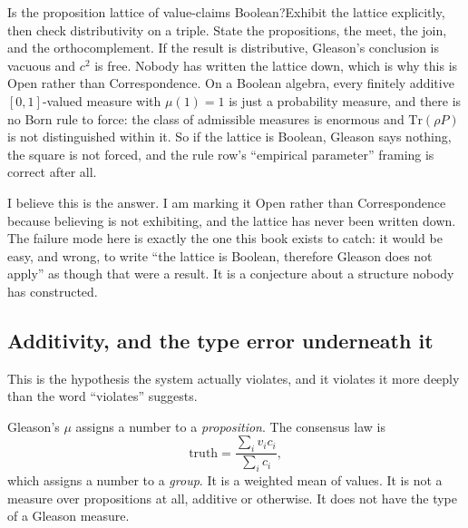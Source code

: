 \begin{Open}{Is the proposition lattice of value-claims Boolean?}{Exhibit the lattice explicitly, then check distributivity on a triple.}
State the propositions, the meet, the join, and the orthocomplement. If the result is distributive, Gleason's conclusion is vacuous and $c^2$ is free. Nobody has written the lattice down, which is why this is Open rather than Correspondence.
On a Boolean algebra, every finitely additive $[0,1]$-valued measure with $\mu(1)=1$ is just a probability measure, and there is no Born rule to force: the class of admissible measures is enormous and $\mathrm{Tr}(\rho P)$ is not distinguished within it. So if the lattice is Boolean, Gleason says nothing, the square is not forced, and the rule row's ``empirical parameter'' framing is correct after all.

I believe this is the answer. I am marking it Open rather than Correspondence because believing is not exhibiting, and the lattice has never been written down. The failure mode here is exactly the one this book exists to catch: it would be easy, and wrong, to write ``the lattice is Boolean, therefore Gleason does not apply'' as though that were a result. It is a conjecture about a structure nobody has constructed.
\end{Open}

\subsection{Additivity, and the type error underneath it}

This is the hypothesis the system actually violates, and it violates it more deeply than the word ``violates'' suggests.

Gleason's $\mu$ assigns a number to a \emph{proposition}. The consensus law is
\begin{equation}
\mathrm{truth} = \frac{\sum_i v_i c_i}{\sum_i c_i},
\end{equation}
which assigns a number to a \emph{group}. It is a weighted mean of values. It is not a measure over propositions at all, additive or otherwise. It does not have the type of a Gleason measure.


